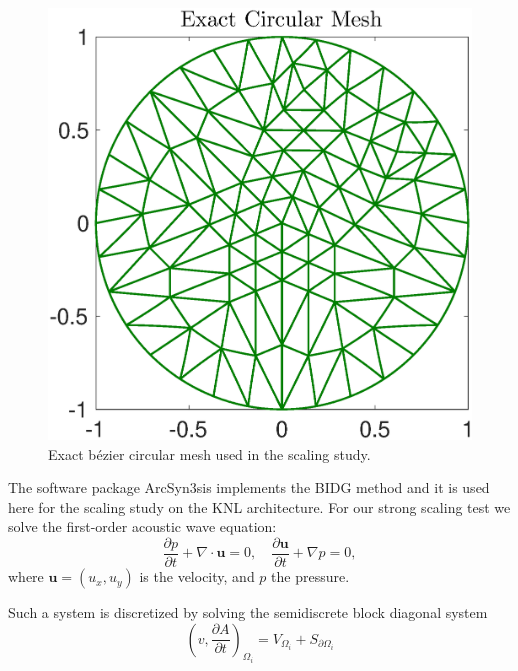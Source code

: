 \begin{figure}
\begin{center}
\includegraphics[width=0.8\linewidth]{./bidg_data/168_circ}
\end{center}
\vspace*{-.5cm}
\caption{Exact b\'{e}zier circular mesh used in the scaling study.}
\label{fig:168_circ}
\end{figure}

The software package ArcSyn3sis implements the BIDG method and it is used here
for the scaling study on the KNL architecture. For our strong scaling test we solve the first-order acoustic wave equation:
\begin{equation}
  \label{awe}
  \frac{\partial p}{\partial t} + \nabla\cdot \boldsymbol{u} = 0, \quad
  \frac{\partial\boldsymbol{u}}{\partial t} + \nabla p = 0,
\end{equation}
where $\boldsymbol{u}=(u_x,u_y)$ is the velocity, and $p$ the pressure.

Such a system is discretized by solving the semidiscrete block diagonal system
\[
  \left( v, \frac{ \partial A}{\partial t} \right)_{\Omega_{i}} =
  V_{\Omega_{i}}+S_{\partial\Omega_{i}}
\]

